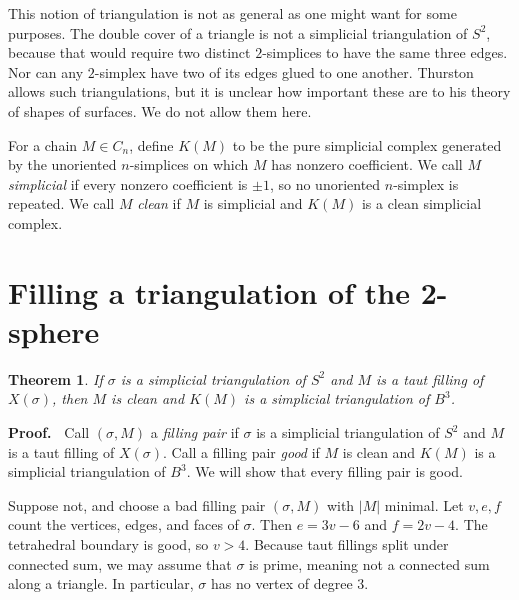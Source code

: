 \documentclass[12pt]{article}
\newtheorem{theorem}{Theorem}
\newcommand{\proofstart}{{\noindent \bf Proof.\ }}
\begin{document}
This notion of triangulation is not as general as one might want
for some purposes.
The double cover of a triangle is not a simplicial triangulation
of $S^2$,
because that would require two distinct
$2$-simplices to have the same three edges.
Nor can any $2$-simplex have two of its edges
glued to one another.
Thurston
\cite{thurston:shapes}
allows such triangulations,
but it is unclear how important these are to
his theory of shapes of surfaces.
We do not allow them here.

For a chain $M \in C_n$, define $K(M)$ to be the pure simplicial
complex generated by the unoriented $n$-simplices on which $M$ has
nonzero coefficient.
We call $M$ \emph{simplicial} if every nonzero coefficient is $\pm 1$,
so no unoriented $n$-simplex is repeated.
We call $M$ \emph{clean} if $M$ is simplicial and $K(M)$ is a clean
simplicial complex.

\section{Filling a triangulation of the 2-sphere}

\begin{theorem} \label{th2}
If $\sigma$ is a simplicial triangulation of $S^2$ and $M$ is a taut
filling of $X(\sigma)$, then $M$ is clean and $K(M)$ is a simplicial
triangulation of $B^3$.
\end{theorem}

\proofstart
Call $(\sigma,M)$ a \emph{filling pair} if $\sigma$ is a simplicial
triangulation of $S^2$ and $M$ is a taut filling of $X(\sigma)$.
Call a filling pair \emph{good} if $M$ is clean and $K(M)$ is a
simplicial triangulation of $B^3$.
We will show that every filling pair is good.

Suppose not, and choose a bad filling pair $(\sigma,M)$ with $|M|$
minimal.  Let $v,e,f$ count the vertices, edges, and faces of $\sigma$.
Then $e=3v-6$ and $f=2v-4$.
The tetrahedral boundary is good, so $v>4$.
Because taut fillings split under connected sum, we may assume that
$\sigma$ is prime, meaning not a connected sum along a triangle.
In particular, $\sigma$ has no vertex of degree $3$.
\end{document}
